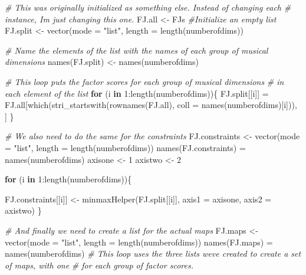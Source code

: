 \documentclass[
]{article}
\newenvironment{Shaded}{\begin{snugshade}}{\end{snugshade}}
\newcommand{\AttributeTok}[1]{\textcolor[rgb]{0.77,0.63,0.00}{#1}}
\newcommand{\CommentTok}[1]{\textcolor[rgb]{0.56,0.35,0.01}{\textit{#1}}}
\newcommand{\ControlFlowTok}[1]{\textcolor[rgb]{0.13,0.29,0.53}{\textbf{#1}}}
\newcommand{\DecValTok}[1]{\textcolor[rgb]{0.00,0.00,0.81}{#1}}
\newcommand{\FunctionTok}[1]{\textcolor[rgb]{0.00,0.00,0.00}{#1}}
\newcommand{\NormalTok}[1]{#1}
\newcommand{\OtherTok}[1]{\textcolor[rgb]{0.56,0.35,0.01}{#1}}
\newcommand{\SpecialCharTok}[1]{\textcolor[rgb]{0.00,0.00,0.00}{#1}}
\newcommand{\StringTok}[1]{\textcolor[rgb]{0.31,0.60,0.02}{#1}}
\begin{document}
\begin{Shaded}
\begin{Highlighting}[]
\CommentTok{\# This was originally initialized as something else. Instead of changing each}
\CommentTok{\# instance, I\textquotesingle{}m just changing this one.}
\NormalTok{FJ.all }\OtherTok{\textless{}{-}}\NormalTok{ FJs}
\CommentTok{\#Initialize an empty list}
\NormalTok{FJ.split }\OtherTok{\textless{}{-}} \FunctionTok{vector}\NormalTok{(}\AttributeTok{mode =} \StringTok{"list"}\NormalTok{, }\AttributeTok{length =} \FunctionTok{length}\NormalTok{(numberofdims))}

\CommentTok{\# Name the elements of the list with the names of each group of musical dimensions}
\FunctionTok{names}\NormalTok{(FJ.split) }\OtherTok{\textless{}{-}} \FunctionTok{names}\NormalTok{(numberofdims)}

\CommentTok{\# This loop puts the factor scores for each group of musical dimensions }
\CommentTok{\# in each element of the list}
\ControlFlowTok{for}\NormalTok{ (i }\ControlFlowTok{in} \DecValTok{1}\SpecialCharTok{:}\FunctionTok{length}\NormalTok{(numberofdims))\{}
\NormalTok{    FJ.split[[i]] }\OtherTok{=}\NormalTok{ FJ.all[}\FunctionTok{which}\NormalTok{(}\FunctionTok{stri\_startswith}\NormalTok{(}\FunctionTok{rownames}\NormalTok{(FJ.all), }
                                                 \AttributeTok{coll =} \FunctionTok{names}\NormalTok{(numberofdims)[i])), ]}
\NormalTok{    \}}

\CommentTok{\# We also need to do the same for the constraints}
\NormalTok{FJ.constraints }\OtherTok{\textless{}{-}} \FunctionTok{vector}\NormalTok{(}\AttributeTok{mode =} \StringTok{"list"}\NormalTok{, }\AttributeTok{length =} \FunctionTok{length}\NormalTok{(numberofdims))}
\FunctionTok{names}\NormalTok{(FJ.constraints) }\OtherTok{=} \FunctionTok{names}\NormalTok{(numberofdims)}
\NormalTok{axisone }\OtherTok{\textless{}{-}} \DecValTok{1}
\NormalTok{axistwo }\OtherTok{\textless{}{-}} \DecValTok{2}

\ControlFlowTok{for}\NormalTok{ (i }\ControlFlowTok{in} \DecValTok{1}\SpecialCharTok{:}\FunctionTok{length}\NormalTok{(numberofdims))\{}
    
\NormalTok{  FJ.constraints[[i]] }\OtherTok{\textless{}{-}} \FunctionTok{minmaxHelper}\NormalTok{(FJ.split[[i]], }
                                      \AttributeTok{axis1 =}\NormalTok{ axisone, }\AttributeTok{axis2 =}\NormalTok{ axistwo)}
\NormalTok{\}}

\CommentTok{\# And finally we need to create a list for the actual maps}
\NormalTok{FJ.maps }\OtherTok{\textless{}{-}} \FunctionTok{vector}\NormalTok{(}\AttributeTok{mode =} \StringTok{"list"}\NormalTok{, }\AttributeTok{length =} \FunctionTok{length}\NormalTok{(numberofdims))}
\FunctionTok{names}\NormalTok{(FJ.maps) }\OtherTok{=} \FunctionTok{names}\NormalTok{(numberofdims)}
\CommentTok{\# This loop uses the three lists we\textquotesingle{}ve created to create a set of maps, with one}
\CommentTok{\# for each group of factor scores.}



\end{Highlighting}
\end{Shaded}
\end{document}
